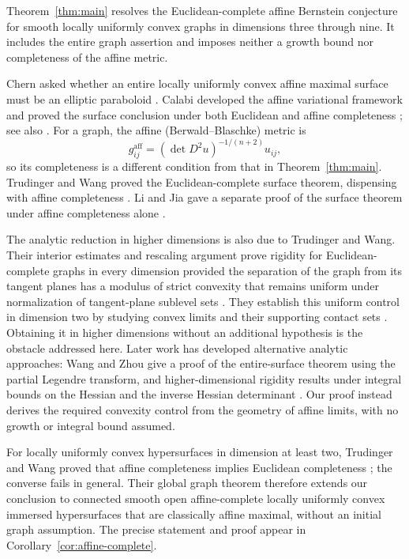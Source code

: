 \documentclass[11pt]{amsart}
\theoremstyle{definition}
\theoremstyle{remark}
\numberwithin{equation}{section}
\begin{document}
Theorem~\ref{thm:main} resolves the Euclidean-complete affine Bernstein
conjecture for smooth locally uniformly convex graphs in dimensions
three through nine. It includes the entire graph assertion and
imposes neither a growth bound nor completeness of the affine metric.

Chern asked whether an entire locally uniformly convex affine maximal
surface must be an elliptic paraboloid \cite{Chern1979}.
Calabi developed the affine variational framework and proved the
surface conclusion under both Euclidean and affine completeness
\cite{Calabi1982}; see also \cite[Section~1]{TW2002}.
For a graph, the affine (Berwald--Blaschke) metric is
\[
 g^{\mathrm{aff}}_{ij}=(\det D^2u)^{-1/(n+2)}u_{ij},
\]
so its completeness is a different condition from that in
Theorem~\ref{thm:main}. Trudinger and Wang proved the
Euclidean-complete surface theorem, dispensing with affine
completeness \cite[Theorem~1.1]{TW2000}. Li and Jia gave a separate
proof of the surface theorem under affine completeness alone
\cite{LiJia2001}.

The analytic reduction in higher dimensions is also due to
Trudinger and Wang. Their interior estimates and rescaling argument
prove rigidity for Euclidean-complete graphs in every dimension provided
the separation of the graph
from its tangent planes has a modulus of strict convexity that remains
uniform under normalization of tangent-plane sublevel sets
\cite[Theorem~4.2 and Corollary~4.3]{TW2000}.
They establish this uniform control in dimension two by studying
convex limits and their supporting contact sets
\cite[Section~5]{TW2000}. Obtaining it in higher dimensions without
an additional hypothesis is the obstacle addressed here.
Later work has developed alternative analytic approaches: Wang and
Zhou give a proof of the entire-surface theorem using the partial
Legendre transform, and higher-dimensional rigidity results under
integral bounds on the Hessian and the inverse Hessian determinant
\cite[Theorem~1.2 and Corollary~1.6]{WangZhou2023}.
Our proof instead derives the required convexity control from the
geometry of affine limits, with no growth or integral bound assumed.

For locally uniformly convex hypersurfaces in dimension at least two,
Trudinger and Wang proved that affine completeness implies Euclidean
completeness
\cite[Theorem~A]{TW2002}; the converse fails in general.
Their global graph theorem \cite[Corollary~1]{TW2002} therefore extends
our conclusion to connected smooth open affine-complete locally
uniformly convex immersed hypersurfaces that are classically affine
maximal, without an initial graph assumption. The precise statement
and proof appear in Corollary~\ref{cor:affine-complete}.
\end{document}
